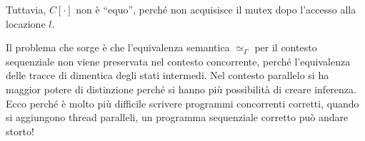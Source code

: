 Tuttavia, $C[\cdot]$ non è ``equo'', perché non acquisisce il mutex dopo 
l'accesso alla locazione $l$.

Il problema che sorge è che l'equivalenza semantica $\simeq_\Gamma$ 
per il contesto sequenziale non viene preservata nel contesto concorrente, perché 
l'equivalenza delle tracce di dimentica degli stati intermedi.
Nel contesto parallelo si ha maggior potere di distinzione perché si hanno più 
possibilità di creare inferenza.
Ecco perché è molto più difficile scrivere programmi concorrenti corretti,
quando si aggiungono thread paralleli, un programma sequenziale corretto può
andare storto!
